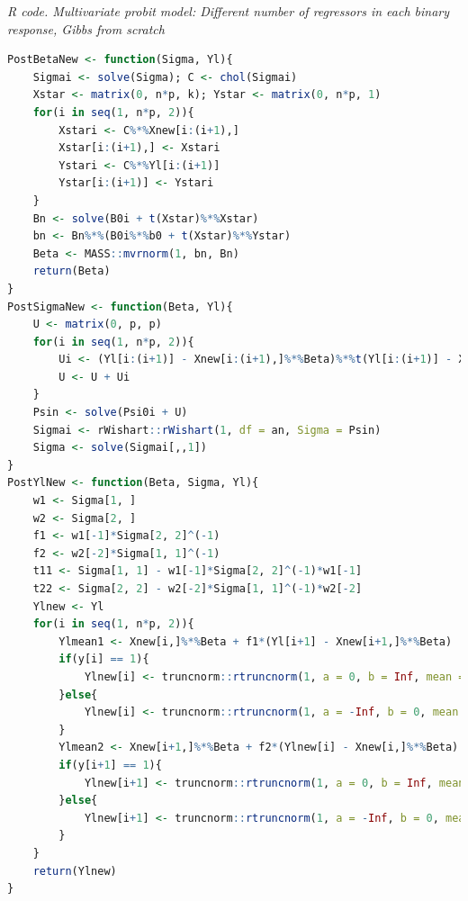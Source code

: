 \begin{enumerate}[leftmargin=*]
\begin{tcolorbox}[enhanced,width=4.67in,center upper,
	fontupper=\large\bfseries,drop shadow southwest,sharp corners]
	\textit{R code. Multivariate probit model: Different number of regressors in each binary response, Gibbs from scratch}
	\begin{VF}
		\begin{lstlisting}[language=R]
PostBetaNew <- function(Sigma, Yl){
	Sigmai <- solve(Sigma); C <- chol(Sigmai)
	Xstar <- matrix(0, n*p, k); Ystar <- matrix(0, n*p, 1)
	for(i in seq(1, n*p, 2)){
		Xstari <- C%*%Xnew[i:(i+1),]
		Xstar[i:(i+1),] <- Xstari
		Ystari <- C%*%Yl[i:(i+1)]
		Ystar[i:(i+1)] <- Ystari
	}
	Bn <- solve(B0i + t(Xstar)%*%Xstar)
	bn <- Bn%*%(B0i%*%b0 + t(Xstar)%*%Ystar)
	Beta <- MASS::mvrnorm(1, bn, Bn)
	return(Beta)
}
PostSigmaNew <- function(Beta, Yl){
	U <- matrix(0, p, p)
	for(i in seq(1, n*p, 2)){
		Ui <- (Yl[i:(i+1)] - Xnew[i:(i+1),]%*%Beta)%*%t(Yl[i:(i+1)] - Xnew[i:(i+1),]%*%Beta)
		U <- U + Ui
	}
	Psin <- solve(Psi0i + U)
	Sigmai <- rWishart::rWishart(1, df = an, Sigma = Psin)
	Sigma <- solve(Sigmai[,,1]) 
}
PostYlNew <- function(Beta, Sigma, Yl){
	w1 <- Sigma[1, ]
	w2 <- Sigma[2, ]
	f1 <- w1[-1]*Sigma[2, 2]^(-1)
	f2 <- w2[-2]*Sigma[1, 1]^(-1)
	t11 <- Sigma[1, 1] - w1[-1]*Sigma[2, 2]^(-1)*w1[-1]  
	t22 <- Sigma[2, 2] - w2[-2]*Sigma[1, 1]^(-1)*w2[-2] 
	Ylnew <- Yl
	for(i in seq(1, n*p, 2)){
		Ylmean1 <- Xnew[i,]%*%Beta + f1*(Yl[i+1] - Xnew[i+1,]%*%Beta)
		if(y[i] == 1){
			Ylnew[i] <- truncnorm::rtruncnorm(1, a = 0, b = Inf, mean = Ylmean1, sd = t11^0.5) 
		}else{
			Ylnew[i] <- truncnorm::rtruncnorm(1, a = -Inf, b = 0, mean = Ylmean1, sd = t11^0.5) 
		}
		Ylmean2 <- Xnew[i+1,]%*%Beta + f2*(Ylnew[i] - Xnew[i,]%*%Beta)
		if(y[i+1] == 1){
			Ylnew[i+1] <- truncnorm::rtruncnorm(1, a = 0, b = Inf, mean = Ylmean2, sd = t22^0.5) 
		}else{
			Ylnew[i+1] <- truncnorm::rtruncnorm(1, a = -Inf, b = 0, mean = Ylmean2, sd = t22^0.5) 
		}
	}
	return(Ylnew)
}
\end{lstlisting}
	\end{VF}
\end{tcolorbox}



\end{enumerate}
